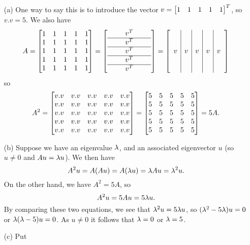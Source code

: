 \documentclass[a4paper]{amsart}
\renewenvironment{solution}{\SolutionInline}{\endSolutionInline}
\begin{document}
\begin{solution}
 \begin{itemize}
  \item[(a)] One way to say this is to introduce the vector
   $v=\left[\begin{matrix} 1&1&1&1&1\end{matrix}\right]^T$, so $v.v=5$.  We also have
   \[
    A = \left[\begin{matrix} 1&1&1&1& 1 \\1&1&1&1& 1 \\1&1&1&1& 1 \\1&1&1&1& 1 \\1&1&1&1& 1 \end{matrix}\right]
      = \left[\begin{array}{ccccc} 
         && v^T && \\ \hline
         && v^T && \\ \hline
         && v^T && \\ \hline
         && v^T && \\ \hline
         && v^T && 
        \end{array}\right] 
      = \left[\begin{array}{c|c|c|c|c}
         &&&& \\ &&&& \\ v & v & v & v & v \\ &&&& \\ &&&&
        \end{array}\right]
   \]
   so 
   \[ A^2 = \left[\begin{matrix} v.v & v.v & v.v & v.v & v.v \\
                 v.v & v.v & v.v & v.v & v.v \\
                 v.v & v.v & v.v & v.v & v.v \\
                 v.v & v.v & v.v & v.v & v.v \\
                 v.v & v.v & v.v & v.v & v.v \end{matrix}\right] 
          = \left[\begin{matrix} 5 & 5 & 5 & 5 & 5 \\
                 5 & 5 & 5 & 5 & 5 \\
                 5 & 5 & 5 & 5 & 5 \\
                 5 & 5 & 5 & 5 & 5 \\
                 5 & 5 & 5 & 5 & 5 \end{matrix}\right] = 5A.
   \]
  \item[(b)] Suppose we have an eigenvalue $\lambda$, and an associated
   eigenvector $u$ (so $u\neq 0$ and $Au=\lambda u$).  We then have
   \[ A^2u = A(Au) = A(\lambda u) = \lambda Au = \lambda^2 u. \]
   On the other hand, we have $A^2=5A$, so 
   \[ A^2u = 5Au = 5\lambda u. \]
   By comparing these two equations, we see that $\lambda^2u=5\lambda u$, so
   $(\lambda^2-5\lambda)u=0$ or $\lambda(\lambda-5)u=0$.  As $u\neq 0$ it follows that
   $\lambda=0$ or $\lambda=5$.
  \item[(c)] Put 

\end{itemize}
\end{solution}
\end{document}
